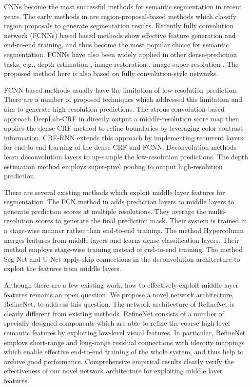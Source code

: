 \documentclass[10pt,twocolumn,letterpaper]{article}
\begin{document}
CNNs become the most successful methods for semantic segmentation in recent years.
The early methods in \cite{GirshickDDM13,BharathECCV2014} are region-proposal-based methods which classify region proposals to generate segmentation results.
Recently fully convolution network (FCNNs) based based methods \cite{LongSD14,ChenPKMY14,Dai2015arXiv} show effective feature generation and end-to-end training,
 and thus become the most popular choice for semantic segmentation.
FCNNs have also been widely applied in other dense-prediction tasks, e.g., depth estimation \cite{dcnn_nips14,eigen2015predicting,liu2014deep},
image restoration \cite{Eigen_iccv13}, image super-resolution \cite{Dong_eccv14}.
The proposed method here is also based on fully convolution-style networks.


FCNN based methods usually have the limitation of low-resolution prediction.
There are a number of proposed techniques which addressed this limitation and aim to generate high-resolution predictions.
The atrous convolution based approach DeepLab-CRF in \cite{ChenPKMY14} directly output a middle-resolution score map 
then applies the dense CRF method \cite{krahenbuhl2012efficient} to refine boundaries by leveraging color contrast information.
CRF-RNN \cite{zheng2015conditional} extends this approach by implementing recurrent layers for end-to-end learning of the dense CRF and FCNN.
Deconvolution methods~\cite{noh2015learning,BadrinarayananK15} learn deconvolution layers to up-sample the low-resolution predictions.
The depth estimation method \cite{liu2015learning} employs super-pixel pooling to output high-resolution prediction.


There are several existing methods which exploit middle layer features for segmentation. The FCN method in \cite{LongSD14} adds prediction layers to middle layers to generate prediction scores at multiple resolutions. They average the multi-resolution scores to generate the final prediction mask. Their system is trained in a stage-wise manner rather than end-to-end training. The method Hypercolumn \cite{hariharan2014hypercolumns} merges features from middle layers and learns dense classification layers. Their method employs stage-wise training instead of end-to-end training. The method Seg-Net \cite{BadrinarayananK15} and U-Net \cite{Ronneberger2015} apply skip-connections in the deconvolution architecture to exploit the features from middle layers. 


Although there are a few existing work, how to effectively exploit middle layer features remains an open question.
We propose a novel network architecture, RefineNet, to address this question.
The network architecture of RefineNet is clearly different from existing methods.
RefineNet consists of a number of specially designed components which are able to refine the coarse high-level semantic features by exploiting low-level visual features.
In particular, RefineNet employs short-range and long-range residual connections with identity mappings 
which enable effective end-to-end training of the whole system, and thus help to archive good performance. 
Comprehensive empirical results clearly verify the effectiveness of our novel network architecture for exploiting middle layer features.
\end{document}
